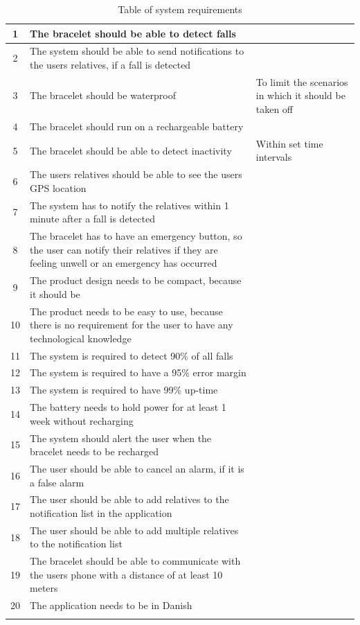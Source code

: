 \begin{longtable}{|c|p{8cm}|p{4cm}|}
1 & The bracelet should be able to detect falls &  \\
\hline
2 & The system should be able to send notifications to the users relatives, if a fall is detected &  \\
\hline
3 & The bracelet should be waterproof & To limit the scenarios in which it should be taken off \\
\hline
4 & The bracelet should run on a rechargeable battery &  \\
\hline
5 & The bracelet should be able to detect inactivity & Within set time intervals \\
\hline
6 & The users relatives should be able to see the users GPS location &  \\
\hline
7 & The system has to notify the relatives within 1 minute after a fall is detected &  \\
\hline
8 & The bracelet has to have an emergency button, so the user can notify their relatives if they are feeling unwell or an emergency has occurred &  \\
\hline
9 & The product design needs to be compact, because it should be  &  \\
\hline
10 & The product needs to be easy to use, because there is no requirement for the user to have any technological knowledge &  \\
\hline
11 & The system is required to detect 90\% of all falls &  \\
\hline
12 & The system is required to have a 95\% error margin &  \\
\hline
13 & The system is required to have 99\% up-time &  \\
\hline
14 & The battery needs to hold power for at least 1 week without recharging &  \\
\hline
15 & The system should alert the user when the bracelet needs to be recharged &  \\
\hline
16 & The user should be able to cancel an alarm, if it is a false alarm &  \\
\hline
17 & The user should be able to add relatives to the notification list in the application &  \\
\hline
18 & The user should be able to add multiple relatives to the notification list &  \\
\hline
19 & The bracelet should be able to communicate with the users phone with a distance of at least 10 meters &  \\
\hline
20 & The application needs to be in Danish &  \\
\hline
\caption{Table of system requirements}
\label{tab:funktionelle_krav_tabel}
\end{longtable}


